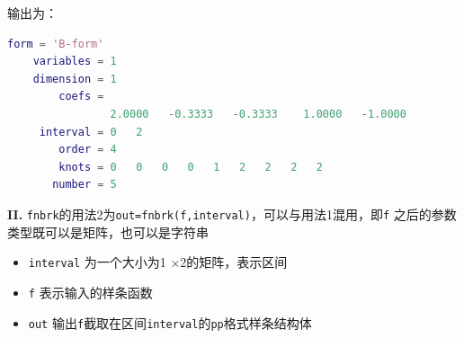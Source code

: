  输出为：
\begin{lstlisting}[language = matlab ]
         form = 'B-form'
    variables = 1
    dimension = 1
        coefs = 
                2.0000   -0.3333   -0.3333    1.0000   -1.0000
     interval = 0   2
        order = 4
        knots = 0   0   0   0   1   2   2   2   2
       number = 5
\end{lstlisting}

\textbf{II.}
\texttt{fnbrk}的用法2为\texttt{out=fnbrk(f,interval)}，可以与用法1混用，即\texttt{f} 之后的参数类型既可以是矩阵，也可以是字符串
\begin{itemize}
    \item \texttt{interval} 为一个大小为1 $\times $2的矩阵，表示区间
    \item \texttt{f} 表示输入的样条函数
    \item \texttt{out} 输出\texttt{f}截取在区间\texttt{interval}的\texttt{pp}格式样条结构体
\end{itemize} 
